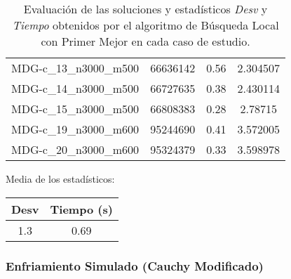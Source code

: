 \documentclass{article}
\begin{document}
\begin{table}[H]
\begin{tabular}{|cccc|}
		MDG-c\_13\_n3000\_m500 & 66636142 & 0.56 & 2.304507\\
		MDG-c\_14\_n3000\_m500 & 66727635 & 0.38 & 2.430114\\
		MDG-c\_15\_n3000\_m500 & 66808383 & 0.28 & 2.78715\\
		MDG-c\_19\_n3000\_m600 & 95244690 & 0.41 & 3.572005\\
		MDG-c\_20\_n3000\_m600 & 95324379 & 0.33 & 3.598978\\
		\hline
	\end{tabular}
	\caption{Evaluación de las soluciones y estadísticos \emph{Desv} y \emph{Tiempo} obtenidos por el algoritmo de Búsqueda Local
		con Primer Mejor en cada caso de estudio.}
	\label{tab:ls-primer-mejor}
\end{table}

Media de los estadísticos:
\begin{table}[H]
	\centering
	\begin{tabular}{|cc|}
		\hline
		Desv & Tiempo (s)\\ \hline
		1.3 & 0.69 \\
		\hline
	\end{tabular}
\end{table}

\pagebreak

\subsubsection*{Enfriamiento Simulado (Cauchy Modificado)}
\end{document}
